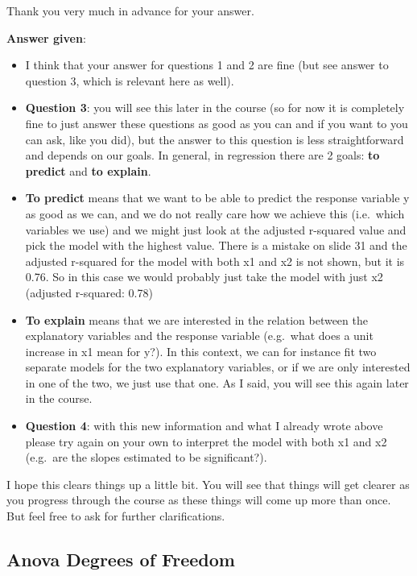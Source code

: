 \documentclass[
  letterpaper,
  8pt,
  a4paper]{book}
\providecommand{\tightlist}{%
  \setlength{\itemsep}{0pt}\setlength{\parskip}{0pt}}
\begin{document}
Thank you very much in advance for your answer.

\textbf{Answer given}:

\begin{itemize}
\tightlist
\item
  I think that your answer for questions 1 and 2 are fine (but see
  answer to question 3, which is relevant here as well).
\item
  \textbf{Question 3}: you will see this later in the course (so for now
  it is completely fine to just answer these questions as good as you
  can and if you want to you can ask, like you did), but the answer to
  this question is less straightforward and depends on our goals. In
  general, in regression there are 2 goals: \textbf{to predict} and
  \textbf{to explain}.
\item
  \textbf{To predict} means that we want to be able to predict the
  response variable y as good as we can, and we do not really care how
  we achieve this (i.e.~which variables we use) and we might just look
  at the adjusted r-squared value and pick the model with the highest
  value. There is a mistake on slide 31 and the adjusted r-squared for
  the model with both x1 and x2 is not shown, but it is 0.76. So in this
  case we would probably just take the model with just x2 (adjusted
  r-squared: 0.78)
\item
  \textbf{To explain} means that we are interested in the relation
  between the explanatory variables and the response variable (e.g.~what
  does a unit increase in x1 mean for y?). In this context, we can for
  instance fit two separate models for the two explanatory variables, or
  if we are only interested in one of the two, we just use that one. As
  I said, you will see this again later in the course.
\item
  \textbf{Question 4}: with this new information and what I already
  wrote above please try again on your own to interpret the model with
  both x1 and x2 (e.g.~are the slopes estimated to be significant?).
\end{itemize}

I hope this clears things up a little bit. You will see that things will
get clearer as you progress through the course as these things will come
up more than once. But feel free to ask for further clarifications.

\subsection*{Anova Degrees of Freedom}\label{anova-degrees-of-freedom}
\end{document}
